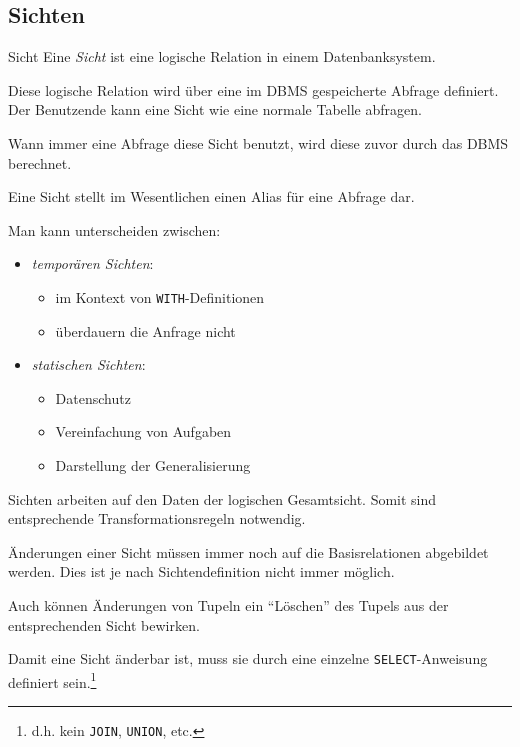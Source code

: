 \subsection{Sichten}

\begin{defi}{Sicht}
    Eine \emph{Sicht} ist eine logische Relation in einem Datenbanksystem.

    Diese logische Relation wird über eine im DBMS gespeicherte Abfrage definiert.
    Der Benutzende kann eine Sicht wie eine normale Tabelle abfragen.

    Wann immer eine Abfrage diese Sicht benutzt, wird diese zuvor durch das DBMS berechnet.

    Eine Sicht stellt im Wesentlichen einen Alias für eine Abfrage dar.

    Man kann unterscheiden zwischen:
    \begin{itemize}
        \item \emph{temporären Sichten}:
              \begin{itemize}
                  \item im Kontext von \texttt{WITH}-Definitionen
                  \item überdauern die Anfrage nicht
              \end{itemize}
        \item \emph{statischen Sichten}:
              \begin{itemize}
                  \item Datenschutz
                  \item Vereinfachung von Aufgaben
                  \item Darstellung der Generalisierung
              \end{itemize}
    \end{itemize}

    Sichten arbeiten auf den Daten der logischen Gesamtsicht.
    Somit sind entsprechende Transformationsregeln notwendig.

    Änderungen einer Sicht müssen immer noch auf die Basisrelationen abgebildet werden.
    Dies ist je nach Sichtendefinition nicht immer möglich.

    Auch können Änderungen von Tupeln ein \enquote{Löschen} des Tupels aus der entsprechenden Sicht bewirken.

    Damit eine Sicht änderbar ist, muss sie durch eine einzelne \texttt{SELECT}-Anweisung definiert sein.\footnote{d.h. kein \texttt{JOIN}, \texttt{UNION}, etc.}


\end{defi}
